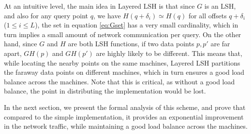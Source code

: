 \documentclass{acm_proc_article-sp}
\numberwithin{equation}{section}
\numberwithin{figure}{section}
\begin{document}
At an intuitive level, the main idea in Layered LSH is that since $G$ is an LSH, and also for any query point $q$, we have $H(q+\delta_i)\simeq H(q)$ for all offsets $q+\delta_i$ ($1\leq i\leq L$), the set in equation \ref{eq:Gset} has a very small cardinality, which in turn implies a small amount of network communication per query. On the other hand, since $G$ and $H$ are both LSH functions, if two data points $p,p'$ are far apart, $GH(p)$ and $GH(p')$ are highly likely to be different. This means that, while locating the nearby points on the same machines, Layered LSH partitions the faraway data points on different machines, which in turn ensures a good load balance across the machines. Note that this is critical, as without a good load balance, the point in distributing the implementation would be lost.

In the next section, we present the formal analysis of this scheme, and prove that compared to the simple implementation, it provides an exponential improvement in the network traffic, while maintaining a good load balance across the machines. 
\end{document}
